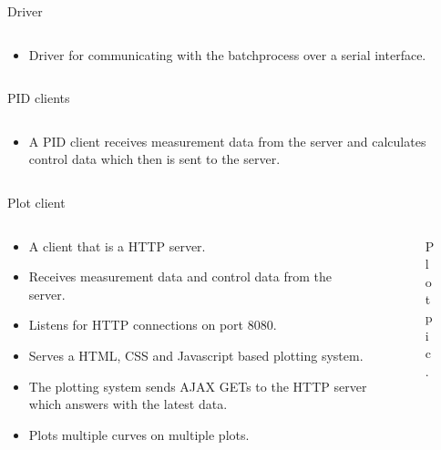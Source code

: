 \documentclass{beamer}
\begin{document}
\begin{frame}{Driver}
\begin{columns}[T]
    \begin{column}{.55\textwidth}
        \begin{itemize}
            \item Driver for communicating with the batchprocess over a serial interface.
            
        \end{itemize}
    \end{column}
    \end{columns}
\end{frame}

\begin{frame}{PID clients}
\begin{columns}[T]
    \begin{column}{.55\textwidth}
        \begin{itemize}
            \item A PID client receives measurement data from the server and calculates control data which then is sent to the server.
            
        \end{itemize}
    \end{column}
    \end{columns}
\end{frame}

\begin{frame}{Plot client}
\begin{columns}[T]
    \begin{column}{.55\textwidth}
        \begin{itemize}
            \item A client that is a HTTP server.
            \item Receives measurement data and control data from the server.
            \item Listens for HTTP connections on port 8080.
            \item Serves a HTML, CSS and Javascript based plotting system.
            \item The plotting system sends AJAX GETs to the HTTP server which answers with the latest data.
            \item Plots multiple curves on multiple plots.
        \end{itemize}
    \end{column}
    \begin{column}{.45\textwidth}
        \begin{figure}[H]
           \centering
           	Plot pic.
        \end{figure}
    \end{column}
    \end{columns}
\end{frame}
\end{document}
